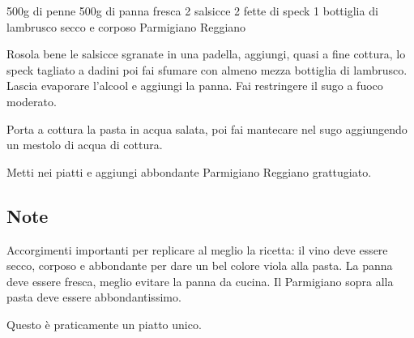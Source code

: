 \begin{ingreds}
	500g di penne 
	500g di panna fresca 
	2 salsicce 
	2 fette di speck 
	1 bottiglia di lambrusco secco e corposo 
	Parmigiano Reggiano 

\end{ingreds}

\begin{method}
Rosola bene le salsicce sgranate in una padella, aggiungi, quasi a fine cottura, lo speck tagliato a dadini poi fai sfumare con almeno mezza bottiglia di lambrusco. Lascia evaporare l'alcool e aggiungi la panna. Fai restringere il sugo a fuoco moderato.

Porta a cottura la pasta in acqua salata, poi fai mantecare nel sugo aggiungendo un mestolo di acqua di cottura.

Metti nei piatti e aggiungi abbondante Parmigiano Reggiano grattugiato.

\end{method}
\subsection*{Note}
	Accorgimenti importanti per replicare al meglio la ricetta: il vino deve essere secco, corposo e abbondante per dare un bel colore viola alla pasta. La panna deve essere fresca, meglio evitare la panna da cucina. Il Parmigiano sopra alla pasta deve essere abbondantissimo.

	Questo è praticamente un piatto unico.


